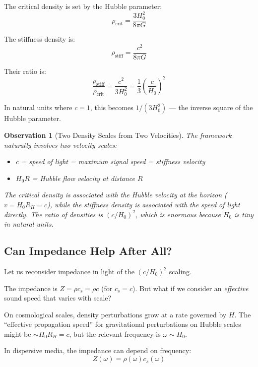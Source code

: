 \documentclass[11pt,a4paper]{article}
\newcommand{\rhocrit}{\ensuremath{\rho_{\mathrm{crit}}}}
\newcommand{\rhostiff}{\ensuremath{\rho_{\mathrm{stiff}}}}
\newtheorem{observation}{Observation}
\theoremstyle{definition}
\begin{document}
The critical density is set by the Hubble parameter:
\begin{equation}
\rhocrit = \frac{3H_0^2}{8\pi G}
\end{equation}

The stiffness density is:
\begin{equation}
\rhostiff = \frac{c^2}{8\pi G}
\end{equation}

Their ratio is:
\begin{equation}
\frac{\rhostiff}{\rhocrit} = \frac{c^2}{3H_0^2} = \frac{1}{3} \left(\frac{c}{H_0}\right)^2
\end{equation}

In natural units where $c = 1$, this becomes $1/(3H_0^2)$ --- the inverse square of the Hubble parameter.

\begin{observation}[Two Density Scales from Two Velocities]
The framework naturally involves two velocity scales:
\begin{itemize}
    \item $c$ = speed of light = maximum signal speed = stiffness velocity
    \item $H_0 R$ = Hubble flow velocity at distance $R$
\end{itemize}

The critical density is associated with the Hubble velocity at the horizon ($v = H_0 R_H = c$), while the stiffness density is associated with the speed of light directly. The ratio of densities is $(c/H_0)^2$, which is enormous because $H_0$ is tiny in natural units.
\end{observation}

\subsection{Can Impedance Help After All?}
\label{sec:impedance_revisited}

Let us reconsider impedance in light of the $(c/H_0)^2$ scaling.

The impedance is $Z = \rho c_s = \rho c$ (for $c_s = c$). But what if we consider an \emph{effective} sound speed that varies with scale?

On cosmological scales, density perturbations grow at a rate governed by $H$. The ``effective propagation speed'' for gravitational perturbations on Hubble scales might be $\sim H_0 R_H = c$, but the relevant frequency is $\omega \sim H_0$.

In dispersive media, the impedance can depend on frequency:
\begin{equation}
Z(\omega) = \rho(\omega) c_s(\omega)
\end{equation}
\end{document}
